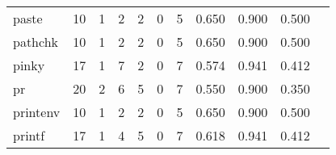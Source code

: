 \begin{longtable}{lp{1.20cm}p{1.20cm}p{1.20cm}p{1.20cm}p{1.20cm}p{1.20cm}p{1.20cm}p{1.20cm}p{1.20cm}p{1.20cm}}
paste     &                                    10 &                                                  1 &                                                  2 &                                                  2 &                                                  0 &                                                  5 &                                         0.650 &                                              0.900 &                                              0.500 \\
pathchk   &                                    10 &                                                  1 &                                                  2 &                                                  2 &                                                  0 &                                                  5 &                                         0.650 &                                              0.900 &                                              0.500 \\
pinky     &                                    17 &                                                  1 &                                                  7 &                                                  2 &                                                  0 &                                                  7 &                                         0.574 &                                              0.941 &                                              0.412 \\
pr        &                                    20 &                                                  2 &                                                  6 &                                                  5 &                                                  0 &                                                  7 &                                         0.550 &                                              0.900 &                                              0.350 \\
printenv  &                                    10 &                                                  1 &                                                  2 &                                                  2 &                                                  0 &                                                  5 &                                         0.650 &                                              0.900 &                                              0.500 \\
printf    &                                    17 &                                                  1 &                                                  4 &                                                  5 &                                                  0 &                                                  7 &                                         0.618 &                                              0.941 &                                              0.412 \\

\end{longtable}
